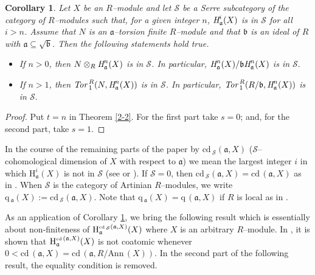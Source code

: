 \documentclass[10pt]{amsart}
\newtheorem{cor}[thm]{Corollary}
\newcommand{\Ann}{\mbox{Ann}\,}
\newcommand{\Tor}{\mbox{Tor}\,}
\newcommand{\cd}{\mbox{cd}\,}
\newcommand{\q}{\mbox{q}\,}
\renewcommand{\H}{\mbox{H}}
\newcommand{\fa}{\mathfrak{a}}
\newcommand{\fb}{\mathfrak{b}}
\begin{document}
\begin{cor} \label {3-2} Let $X$ be an $R$--module and let $\mathcal{S}$ be a Serre subcategory of the
category of $R$--modules such that, for a given integer $n$,
$\emph{\H}^{i}_{\fa}(X)$ is in $\mathcal{S}$ for all $i> n$. Assume
that $N$ is an $\fa$--torsion finite $R$--module and that $\fb$ is
an ideal of $R$ with $\fa\subseteq \sqrt{\fb}$. Then the following
statements hold true.
               \begin{itemize}
                   \item[(i)]{If $n> 0$, then $N\otimes_{R} \emph{\H}^{n}_{\fa}(X)$ is in $\mathcal{S}$.
                   In particular, $\emph{\H}^{n}_{\fa}(X)/\fb\emph{\H}^{n}_{\fa}(X)$
                   is in $\mathcal{S}.$}
                   \item[(ii)]{If $n> 1$, then $\emph{\Tor}^{R}_{1}(N, \emph{\H}^{n}_{\fa}(X))$ is in $\mathcal{S}$.
                   In particular, $\emph{\Tor}^{R}_{1}(R/\fb, \emph{\H}^{n}_{\fa}(X))$
                   is in $\mathcal{S}.$}
               \end{itemize}
\end{cor}

\begin{proof} Put $t= n$  in Theorem \ref{2-2}. For the first part take $ s= 0$; and, for the second part, take $s= 1$.
\end{proof}





In the course of the remaining parts of the paper by
$\cd_{\mathcal{S}}(\fa, X)$ ($\mathcal{S}$--cohomological dimension
of $X$ with respect to $\fa$) we mean the largest integer $i$ in
which $\H^{i}_{\fa}(X)$ is not in $\mathcal{S}$ (see \cite
[Definition 3.4] {AT} or  \cite [Definition 3.5] {AM}). If
$\mathcal{S}=0$, then $\cd_{\mathcal{S}}(\fa, X)= \cd(\fa, X)$ as in
\cite{Ha1}. When $\mathcal{S}$ is the category of Artinian
$R$--modules, we write $\q_{\fa}(X):= \cd_{\mathcal{S}}(\fa, X)$.
Note that  $\q_{\fa}(X)= \q(\fa, X)$ if $R$ is local as in
\cite[Definition 3.1]{DY1}.

As an application of Corollary \ref {3-2}, we bring the following result
which is essentially about non-finiteness of $\H^{\tiny\cd_{\mathcal{S}}(\fa, X)}_{\fa}(X)$
where $X$ is an arbitrary $R$--module. In \cite [Theorem 3.2] {H}, it is shown that
$\H^{\tiny\cd(\fa, X)}_{\fa}(X)$ is not coatomic whenever $0< \cd(\fa, X)= \cd(\fa, R/\Ann(X))$.
In the second part of the following result, the equality condition is removed.
\end{document}
